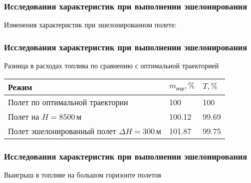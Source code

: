 \documentclass{beamer}
\begin{document}
\begin{frame}[t]
    \frametitle{Исследования характеристик при выполнении эшелонирования}
    \begin{center}
        Изменения характеристик при эшелонированном полете: 

        \begin{minipage}{0.49\textwidth}
            \centering
        \end{minipage}
        \hfill
        \begin{minipage}{0.49\textwidth}
            \centering
        \end{minipage}
    \end{center}
\end{frame}


\begin{frame}[t]
    \frametitle{Исследования характеристик при выполнении эшелонирования}
    \begin{center}
    Разница в расходах топлива по сравнению с оптимальной траекторией

\begin{tabular}{|p{}|p{}|p{}|}
    \hline
    Режим & $m_{изр}, \%$ & $T, \%$\\
    \hline
    Полет по оптимальной траектории & 100 & 100 \\
    \hline
    Полет на $H=8500\,м$ & 100.12 & 99.69\\
    \hline
    Полет эшелонированный полет $\Delta H =300\, м$ & 101.87 & 99.75\\
    \hline
\end{tabular}
    \end{center}
\end{frame}

\begin{frame}[t]
    \frametitle{Исследования характеристик при выполнении эшелонирования}
    \begin{center}
        Выигрыш в топливе на большом горизонте полетов
        \resizebox{0.8\textwidth}{!}{}
    \end{center}
\end{frame}
\end{document}
